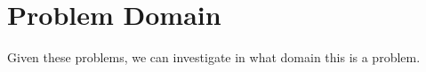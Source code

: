 \section{Problem Domain}
Given these problems, we can investigate in what domain this is a problem.
